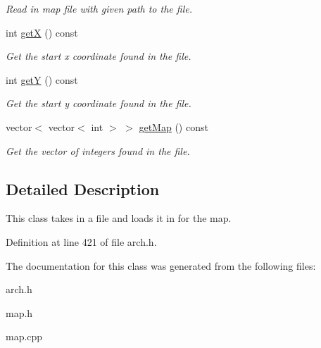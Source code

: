\begin{DoxyCompactItemize}
\begin{DoxyCompactList}\small\item\em Read in map file with given path to the file. \end{DoxyCompactList}\item 
int \hyperlink{classMap_ae235f91105c54961e42e2750cf52deaa}{getX} () const \hypertarget{classMap_ae235f91105c54961e42e2750cf52deaa}{}\label{classMap_ae235f91105c54961e42e2750cf52deaa}

\begin{DoxyCompactList}\small\item\em Get the start x coordinate found in the file. \end{DoxyCompactList}\item 
int \hyperlink{classMap_a7d9858d941f8e40226f4a12d4f8437c4}{getY} () const \hypertarget{classMap_a7d9858d941f8e40226f4a12d4f8437c4}{}\label{classMap_a7d9858d941f8e40226f4a12d4f8437c4}

\begin{DoxyCompactList}\small\item\em Get the start y coordinate found in the file. \end{DoxyCompactList}\item 
vector$<$ vector$<$ int $>$ $>$ \hyperlink{classMap_a84b44f93dc09fc770710b84bf070adfe}{get\+Map} () const \hypertarget{classMap_a84b44f93dc09fc770710b84bf070adfe}{}\label{classMap_a84b44f93dc09fc770710b84bf070adfe}

\begin{DoxyCompactList}\small\item\em Get the vector of integers found in the file. \end{DoxyCompactList}\end{DoxyCompactItemize}


\subsection{Detailed Description}
This class takes in a file and loads it in for the map. 

Definition at line 421 of file arch.\+h.



The documentation for this class was generated from the following files\+:\begin{DoxyCompactItemize}
\item 
arch.\+h\item 
map.\+h\item 
map.\+cpp\end{DoxyCompactItemize}
